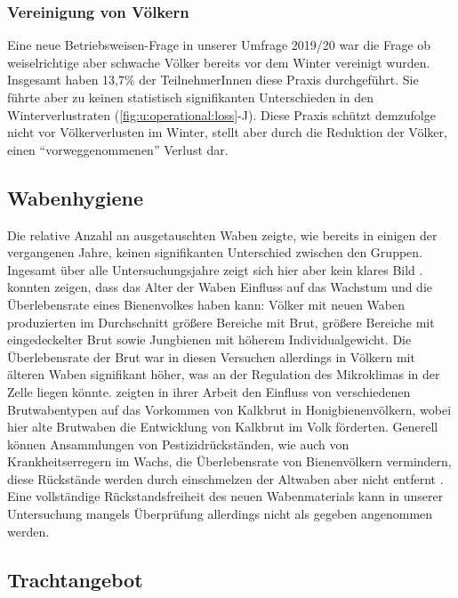 \subsubsection{Vereinigung von Völkern}

Eine neue Betriebsweisen-Frage in unserer Umfrage 2019/20 war die Frage ob weiselrichtige aber schwache Völker bereits vor dem Winter vereinigt wurden. Insgesamt haben 13,7\% der TeilnehmerInnen diese Praxis durchgeführt. Sie führte aber zu keinen statistisch signifikanten Unterschieden in den Winterverlustraten (\cref{fig:u:operational:loss}-J). Diese Praxis schützt demzufolge nicht vor Völkerverlusten im Winter, stellt aber durch die Reduktion der Völker, einen \enquote{vorweggenommenen} Verlust dar.

\subsection{Wabenhygiene}

Die relative Anzahl an ausgetauschten Waben zeigte, wie bereits in einigen der vergangenen Jahre, keinen signifikanten Unterschied zwischen den Gruppen. Ingesamt über alle Untersuchungsjahre zeigt sich hier aber kein klares Bild \citep{crailsheim2018, oberreiter2020}.
\newline
\cite{berry2001} konnten zeigen, dass das Alter der Waben Einfluss auf das Wachstum und die Überlebensrate eines Bienenvolkes haben kann: Völker mit neuen Waben produzierten im Durchschnitt größere Bereiche mit Brut, größere Bereiche mit eingedeckelter Brut sowie Jungbienen mit höherem Individualgewicht. Die Überlebensrate der Brut war in diesen Versuchen allerdings in Völkern mit älteren Waben signifikant höher, was an der Regulation des Mikroklimas in der Zelle liegen könnte. \cite{koenig1986} zeigten in ihrer Arbeit den Einfluss von verschiedenen Brutwabentypen auf das Vorkommen von Kalkbrut in Honigbienenvölkern, wobei hier alte Brutwaben die Entwicklung von Kalkbrut im Volk förderten.
\newline
Generell können Ansammlungen von Pestizidrückständen, wie auch von Krankheitserregern im Wachs, die Überlebensrate von Bienenvölkern vermindern, diese Rückstände werden durch einschmelzen der Altwaben aber nicht entfernt \citep{calatayud-vernich2018}. Eine vollständige Rückstandsfreiheit des neuen Wabenmaterials kann in unserer Untersuchung mangels Überprüfung allerdings nicht als gegeben angenommen werden. 

\subsection{Trachtangebot}

